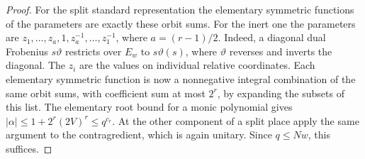 \documentclass[a4paper,11pt]{article}
\theoremstyle{definition}
\theoremstyle{remark}
\numberwithin{equation}{section}
\begin{document}
\begin{proof}
For the split standard representation the elementary symmetric
functions of the parameters are exactly these orbit sums.
For the inert one the parameters are
\(z_1,\ldots,z_a,1,z_a^{-1},\ldots,z_1^{-1}\),
where \(a=(r-1)/2\). Indeed, a diagonal dual Frobenius
\(s\vartheta\) restricts over \(E_w\) to \(s\vartheta(s)\),
where \(\vartheta\) reverses and inverts the diagonal.
The \(z_i\) are the values on individual relative coordinates.
Each elementary symmetric function is now a nonnegative
integral combination of the same orbit sums, with coefficient
sum at most \(2^r\), by expanding the subsets of this list.
The elementary root bound for a monic polynomial gives
\(|\alpha|\le1+2^r(2V)^r\le q^{c_r}\). At the other component
of a split place apply the same argument to the contragredient,
which is again unitary. Since \(q\le Nw\), this suffices.
\end{proof}
\end{document}

